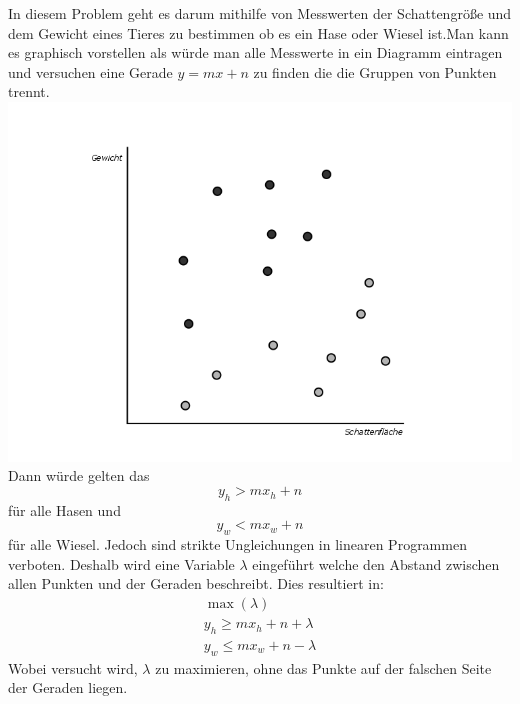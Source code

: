 In diesem Problem geht es darum mithilfe von Messwerten der Schattengröße und dem Gewicht eines Tieres zu bestimmen ob es ein Hase oder Wiesel ist.Man kann es graphisch vorstellen als würde man alle Messwerte in ein Diagramm eintragen und versuchen eine Gerade $y=mx+n$ zu finden die die Gruppen von Punkten trennt.
\includegraphics[width=\textwidth]{Grafiken/HaseWieselBild.png}
Dann würde gelten das \[y_h>mx_h+n\] für alle Hasen und \[
y_w<mx_w+n\] für alle Wiesel. Jedoch sind strikte Ungleichungen in linearen Programmen verboten. Deshalb wird eine Variable $\lambda$ eingeführt welche den Abstand zwischen allen Punkten und der Geraden beschreibt. Dies resultiert in:
\begin{align*}
	\max{}(\lambda)\\
	y_h\geq{}mx_h+n+\lambda\\
	y_w\leq{}mx_w+n-\lambda
\end{align*} 
Wobei versucht wird, $\lambda$ zu maximieren, ohne das Punkte auf der falschen Seite der Geraden liegen.
